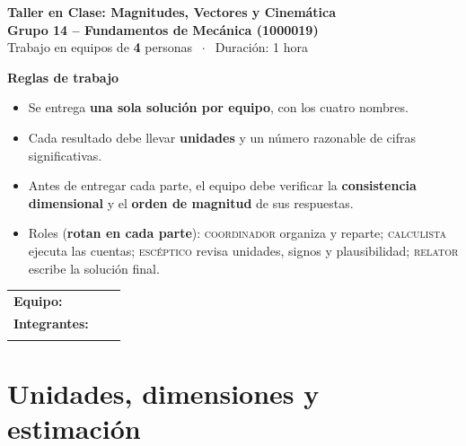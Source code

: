 \documentclass[11pt,letterpaper]{article}
\newcommand{\rulesec}{\vspace{-0.7\baselineskip}{\color{UnalGreen}\rule{\textwidth}{0.8pt}}\vspace{0.2\baselineskip}}
\begin{document}
	
	\begin{center}
		{\Large\bfseries Taller en Clase: Magnitudes, Vectores y Cinemática}\\[0.3em]
		{\large\bfseries Grupo 14 -- Fundamentos de Mecánica (1000019)}\\[0.6em]
		{\small Trabajo en equipos de \textbf{4} personas $\;\cdot\;$ Duración: 1 hora}
	\end{center}
	
	\vspace{0.4em}
	
	\begin{tcolorbox}[colback=UnalGreen!4,colframe=UnalGreen!70!black,boxrule=0.6pt,
		left=6pt,right=6pt,top=5pt,bottom=5pt]
		\textbf{Reglas de trabajo}
		\begin{itemize}[leftmargin=1.2em,itemsep=0.15em,topsep=0.25em]
			\item Se entrega \textbf{una sola solución por equipo}, con los cuatro nombres.
			\item Cada resultado debe llevar \textbf{unidades} y un número razonable de cifras significativas.
			\item Antes de entregar cada parte, el equipo debe verificar la \textbf{consistencia dimensional} y el \textbf{orden de magnitud} de sus respuestas.
			\item Roles (\textbf{rotan en cada parte}): \textsc{coordinador} organiza y reparte; \textsc{calculista} ejecuta las cuentas; \textsc{escéptico} revisa unidades, signos y plausibilidad; \textsc{relator} escribe la solución final.
		\end{itemize}
	\end{tcolorbox}
	
	\vspace{0.3em}
	
	\noindent\begin{tabular}{@{}p{}p{}p{}@{}}
		\textbf{Equipo:} & \hrulefill & \\[0.8em]
		\textbf{Integrantes:} & \hrulefill & \hrulefill \\[0.8em]
		& \hrulefill & \hrulefill \\
	\end{tabular}
	
	\section{Unidades, dimensiones y estimación \normalfont\small\textit{}}
	\rulesec
	
\end{document}
